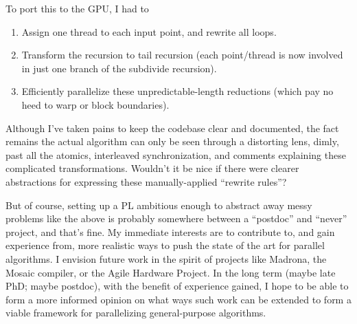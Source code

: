 To port this to the GPU, I had to
\begin{enumerate}
  \item Assign one thread to each input point, and rewrite all loops.

  \item Transform the recursion to tail recursion (each point/thread
  is now involved in just one branch of the subdivide recursion).

  \item Efficiently parallelize these unpredictable-length reductions (which pay
  no heed to warp or block boundaries).
\end{enumerate}

Although I've taken pains to keep the codebase clear and documented,
the fact remains the actual algorithm can only be seen through a
distorting lens, dimly, past all the atomics, interleaved
synchronization, and comments explaining these complicated
transformations.  Wouldn't it be nice if there were clearer
abstractions for expressing these manually-applied ``rewrite rules''?

\ifdefined\STANFORD

But of course, setting up a PL ambitious enough to abstract away messy
problems like the above is probably somewhere between a ``postdoc''
and ``never'' project, and that's fine. My immediate interests are to
contribute to, and gain experience from, more realistic ways to push
the state of the art for parallel algorithms. I envision future work
in the spirit of projects like Madrona, the Mosaic compiler, or the
Agile Hardware Project. In the long term (maybe late PhD; maybe
postdoc), with the benefit of experience gained, I hope to be able to
form a more informed opinion on what ways such work can be extended to
form a viable framework for parallelizing general-purpose algorithms.

\fi



